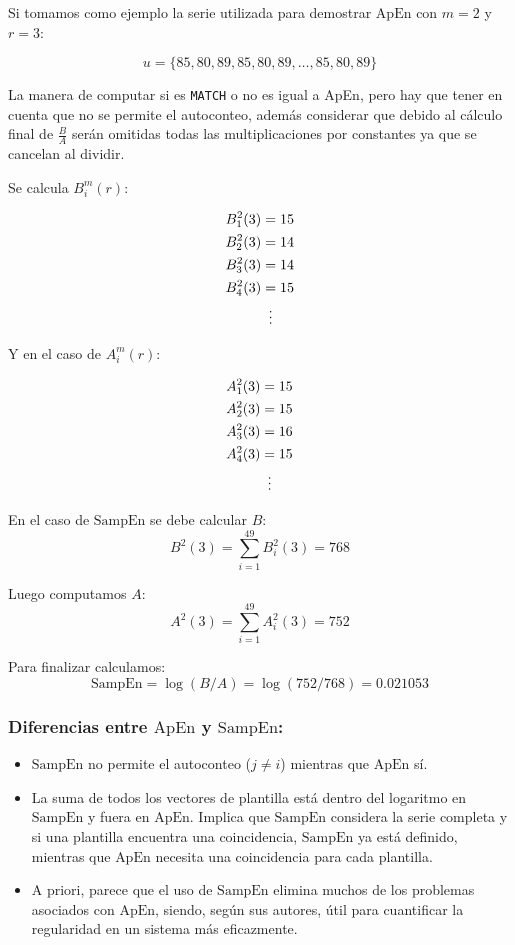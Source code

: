 \documentclass[a4paper,12pt]{article}
\begin{document}
		Si tomamos como ejemplo la serie utilizada para demostrar $\textrm{ApEn}$ con $m=2$ y $r=3$:
				
		$$u = \{85, 80, 89, 85, 80, 89, \dots, 85, 80, 89\}$$
				
		La manera de computar si es \texttt{MATCH} o no es igual a \textrm{ApEn}, pero hay que tener en cuenta que no se permite el autoconteo, además considerar que debido al cálculo final de $\frac{B}{A}$ serán omitidas todas las multiplicaciones por constantes ya que se cancelan al dividir.
				
		Se calcula $B_i^m(r)$:
				
		\begin{align*}
			B_1^2(3) & =15             \\
			B_2^2(3) & =14             \\
			B_3^2(3) & =14             \\
			B_4^2(3) & =15             \\
			         & \vdotswithin{=} \\
		\end{align*}
				
		Y en el caso de $A_i^m(r)$:
				
		\begin{align*}
			A_1^2(3) & =15             \\
			A_2^2(3) & =15             \\
			A_3^2(3) & =16             \\
			A_4^2(3) & =15             \\
			         & \vdotswithin{=} \\
		\end{align*}
				
		En el caso de $\textrm{SampEn}$ se debe calcular $B$:
		$$B^2(3)= \sum_{i=1}^{49} B_i^2(3) = 768$$
				
		Luego computamos $A$:
		$$A^2(3)= \sum_{i=1}^{49} A_i^2(3) = 752$$
				
		Para finalizar calculamos:
		$$\textrm{SampEn} = \log(B/A) = \log(752/768) = 0.021053$$
				
		\subsubsection{Diferencias entre $\textrm{ApEn}$ y $\textrm{SampEn}$:}
		\begin{itemize}[noitemsep, topsep=2pt]
			\item $\textrm{SampEn}$ no permite el autoconteo ($j \neq i$) mientras que $\textrm{ApEn}$ sí. 
			\item La suma de todos los vectores de plantilla está dentro del logaritmo en $\textrm{SampEn}$ y fuera en $\textrm{ApEn}$. Implica que $\textrm{SampEn}$ considera la serie completa y si una plantilla encuentra una coincidencia, $\textrm{SampEn}$ ya está definido, mientras que $\textrm{ApEn}$ necesita una coincidencia para cada plantilla. 
			\item A priori, parece que el uso de $\textrm{SampEn}$ elimina muchos de los problemas asociados con $\textrm{ApEn}$, siendo, según sus autores, útil para cuantificar la regularidad en un sistema más eficazmente.
		\end{itemize}
				
\end{document}
